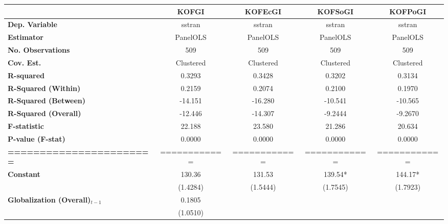\begin{center}
\begin{tabular}{lcccc}
\toprule
                                   & \textbf{KOFGI} & \textbf{KOFEcGI} & \textbf{KOFSoGI} & \textbf{KOFPoGI}  \\
\midrule
\textbf{Dep. Variable}             &     sstran     &      sstran      &      sstran      &      sstran       \\
\textbf{Estimator}                 &    PanelOLS    &     PanelOLS     &     PanelOLS     &     PanelOLS      \\
\textbf{No. Observations}          &      509       &       509        &       509        &       509         \\
\textbf{Cov. Est.}                 &   Clustered    &    Clustered     &    Clustered     &    Clustered      \\
\textbf{R-squared}                 &     0.3293     &      0.3428      &      0.3202      &      0.3134       \\
\textbf{R-Squared (Within)}        &     0.2159     &      0.2074      &      0.2100      &      0.1970       \\
\textbf{R-Squared (Between)}       &    -14.151     &     -16.280      &     -10.541      &     -10.565       \\
\textbf{R-Squared (Overall)}       &    -12.446     &     -14.307      &     -9.2444      &     -9.2670       \\
\textbf{F-statistic}               &     22.188     &      23.580      &      21.286      &      20.634       \\
\textbf{P-value (F-stat)}          &     0.0000     &      0.0000      &      0.0000      &      0.0000       \\
\textbf{=======================}   &  ============  &   ============   &   ============   &   ============    \\
\textbf{Constant}                     &     130.36     &      131.53      &     139.54*      &     144.17*       \\
\textbf{ }                         &    (1.4284)    &     (1.5444)     &     (1.7545)     &     (1.7923)      \\
\textbf{Globalization (Overall)$_{t-1}$}               &     0.1805     &                  &                  &                   \\
\textbf{ }                         &    (1.0510)    &                  &                  &                   \\

\end{tabular}
\end{center}
